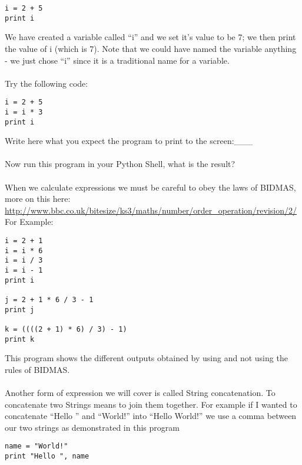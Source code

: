 \documentclass[twocolumn]{article}
\begin{document}
 \begin{lstlisting}
i = 2 + 5
print i
\end{lstlisting}
We have created a variable called ``i'' and we set it's value to be 7; we then print the value of i (which is 7). Note that we could have named the variable anything - we just chose ``i'' since it is a traditional name for a variable.\\
\\
Try the following code:
\begin{lstlisting}
i = 2 + 5
i = i * 3
print i
\end{lstlisting}
Write here what you expect the program to print to the screen:\_\_\_\\
\\
Now run this program in your Python Shell, what is the result?\\
\\
When we calculate expressions we must be careful to obey the laws of BIDMAS, more on this here: \url{http://www.bbc.co.uk/bitesize/ks3/maths/number/order\_operation/revision/2/}\\
For Example:
\begin{lstlisting}
i = 2 + 1
i = i * 6
i = i / 3
i = i - 1
print i

j = 2 + 1 * 6 / 3 - 1
print j

k = ((((2 + 1) * 6) / 3) - 1)
print k
\end{lstlisting}
This program shows the different outputs obtained by using and not using the rules of BIDMAS.\\
\\
Another form of expression we will cover is called String concatenation. To concatenate two Strings means to join them together. For example if I wanted to concatenate ``Hello '' and ``World!'' into ``Hello World!'' we use a comma between our two strings as demonstrated in this program
\begin{lstlisting}
name = "World!"
print "Hello ", name
\end{lstlisting}
\end{document}
